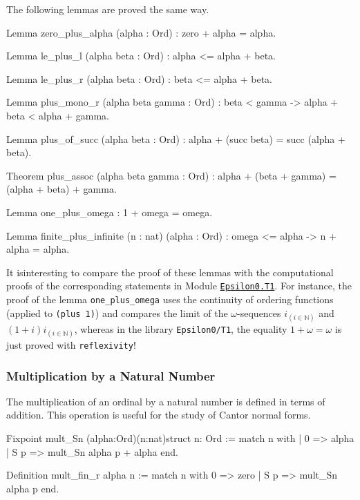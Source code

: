 {The following lemmas are proved the same way.

 \begin{Coqsrc}

Lemma zero_plus_alpha (alpha : Ord) : zero + alpha = alpha.

Lemma le_plus_l (alpha beta : Ord) : alpha <= alpha + beta.

Lemma le_plus_r (alpha beta : Ord) :  beta <= alpha + beta.

Lemma plus_mono_r (alpha beta gamma : Ord) : 
    beta < gamma -> alpha + beta < alpha + gamma.

Lemma plus_of_succ (alpha beta : Ord) :
    alpha + (succ beta) = succ (alpha + beta).

Theorem plus_assoc (alpha beta gamma : Ord) :
  alpha + (beta + gamma) = (alpha + beta) + gamma.

Lemma one_plus_omega :  1 + omega = omega.

Lemma finite_plus_infinite (n : nat) (alpha : Ord) :
  omega <= alpha -> n + alpha = alpha.
\end{Coqsrc} 


It isinteresting to compare the proof of these lemmas with the 
computational proofs of the corresponding statements in Module
\href{../theories/html/hydras.Epsilon0.T1.html}%
{\texttt{Epsilon0.T1}}. 
For instance, the proof of the lemma 
\texttt{one\_plus\_omega} uses the continuity of ordering functions (applied to  \texttt{(plus 1)}) and compares the limit of the $\omega$-sequences $i_{(i \in \mathbb{N})}$ and
$(1+i)i_{(i \in \mathbb{N})}$, whereas in the library  \texttt{Epsilon0/T1}, the equality 
$1+\omega=\omega$ is just proved with \texttt{reflexivity}!



\subsubsection{Multiplication by a Natural Number}

The multiplication of an ordinal by a natural number is defined in terms of addition.
This operation is useful for the study of Cantor normal forms.

\begin{Coqsrc}
Fixpoint mult_Sn (alpha:Ord)(n:nat){struct n}: Ord :=
 match n with 
            | 0 => alpha
            | S p => mult_Sn  alpha p + alpha
 end.

Definition mult_fin_r alpha n :=
  match n with
      0 => zero
    | S p => mult_Sn alpha p
  end.


\end{Coqsrc}}
